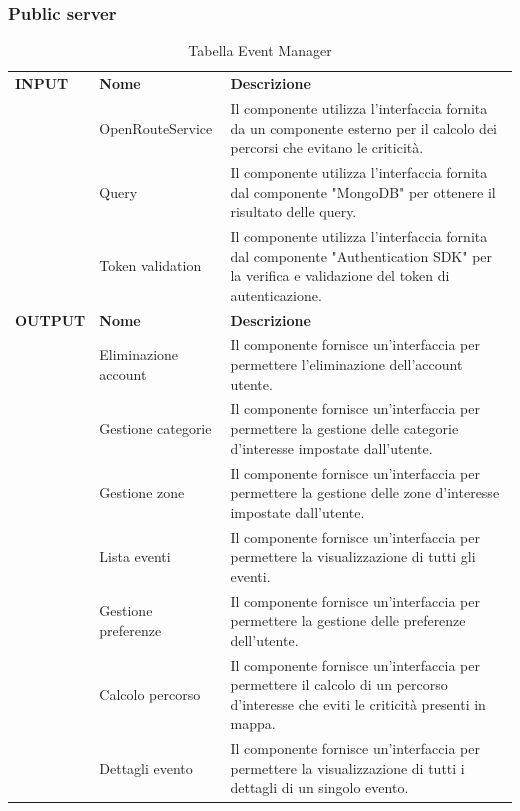 \documentclass{article}
\begin{document}
\clearpage

\subsubsection{Public server}

\begin{table}[htbp]
    \centering
    \renewcommand{\arraystretch}{1.3} %
    \begin{tabularx}{\textwidth}{| l | l | X |}
        \Xhline{2pt}
        \textbf{INPUT} & \textbf{Nome} & \textbf{Descrizione} \\
        \Xhline{2pt}
         & OpenRouteService & Il componente utilizza l'interfaccia fornita da un componente esterno per il calcolo dei percorsi che evitano le criticità. \\
        \hline
         & Query & Il componente utilizza l'interfaccia fornita dal componente "MongoDB" per ottenere il risultato delle query. \\
        \hline
         & Token validation & Il componente utilizza l'interfaccia fornita dal componente "Authentication SDK" per la verifica e validazione del token di autenticazione. \\
        \Xhline{2pt}
        \textbf{OUTPUT} & \textbf{Nome} & \textbf{Descrizione} \\
        \Xhline{2pt}
         & Eliminazione account & Il componente fornisce un'interfaccia per permettere l'eliminazione dell'account utente. \\
        \hline
         & Gestione categorie & Il componente fornisce un'interfaccia per permettere la gestione delle categorie d'interesse impostate dall'utente. \\
        \hline
        & Gestione zone & Il componente fornisce un'interfaccia per permettere la gestione delle zone d'interesse impostate dall'utente. \\
        \hline
        & Lista eventi & Il componente fornisce un'interfaccia per permettere la visualizzazione di tutti gli eventi. \\
        \hline
        & Gestione preferenze & Il componente fornisce un'interfaccia per permettere la gestione delle preferenze dell'utente. \\
        \hline
        & Calcolo percorso & Il componente fornisce un'interfaccia per permettere il calcolo di un percorso d'interesse che eviti le criticità presenti in mappa. \\
        \hline
        & Dettagli evento & Il componente fornisce un'interfaccia per permettere la visualizzazione di tutti i dettagli di un singolo evento. \\
        \hline
    \end{tabularx}
    \caption{Tabella Event Manager}
\end{table}
\end{document}
